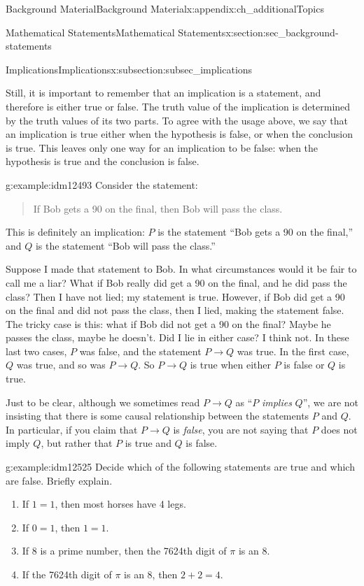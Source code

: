 \documentclass[oneside,10pt,]{book}
\numberwithin{equation}{chapter}
\def\imp{\rightarrow}
\begin{document}
\begin{appendixptx}{Background Material}{}{Background Material}{}{}{x:appendix:ch_additionalTopics}
\begin{sectionptx}{Mathematical Statements}{}{Mathematical Statements}{}{}{x:section:sec_background-statements}
\begin{subsectionptx}{Implications}{}{Implications}{}{}{x:subsection:subsec_implications}
\par
Still, it is important to remember that an implication is a statement, and therefore is either true or false. The truth value of the implication is determined by the truth values of its two parts. To agree with the usage above, we say that an implication is true either when the hypothesis is false, or when the conclusion is true. This leaves only one way for an implication to be false: when the hypothesis is true and the conclusion is false.%
\begin{example}{}{g:example:idm12493}%
Consider the statement:%
\begin{quote}%
If Bob gets a 90 on the final, then Bob will pass the class.%
\end{quote}
This is definitely an implication: \(P\) is the statement ``Bob gets a 90 on the final,'' and \(Q\) is the statement ``Bob will pass the class.''%
\par
Suppose I made that statement to Bob. In what circumstances would it be fair to call me a liar? What if Bob really did get a 90 on the final, and he did pass the class? Then I have not lied; my statement is true. However, if Bob did get a 90 on the final and did not pass the class, then I lied, making the statement false. The tricky case is this: what if Bob did not get a 90 on the final? Maybe he passes the class, maybe he doesn't. Did I lie in either case? I think not. In these last two cases, \(P\) was false, and the statement \(P \imp Q\) was true. In the first case, \(Q\) was true, and so was \(P \imp Q\). So \(P \imp Q\) is true when either \(P\) is false or \(Q\) is true.%
\end{example}
Just to be clear, although we sometimes read \(P \imp Q\) as ``\(P\) \emph{implies} \(Q\)'', we are not insisting that there is some causal relationship between the statements \(P\) and \(Q\). In particular, if you claim that \(P \imp Q\) is \emph{false}, you are not saying that \(P\) does not imply \(Q\), but rather that \(P\) is true and \(Q\) is false.%
\begin{example}{}{g:example:idm12525}%
Decide which of the following statements are true and which are false. Briefly explain.%
\begin{enumerate}
\item{}If \(1=1\), then most horses have 4 legs.%
\item{}If \(0=1\), then \(1=1\).%
\item{}If 8 is a prime number, then the 7624th digit of \(\pi\) is an 8.%
\item{}If the 7624th digit of \(\pi\) is an 8, then \(2+2 = 4\).%

\end{enumerate}
\end{example}
\end{subsectionptx}
\end{sectionptx}
\end{appendixptx}
\end{document}
